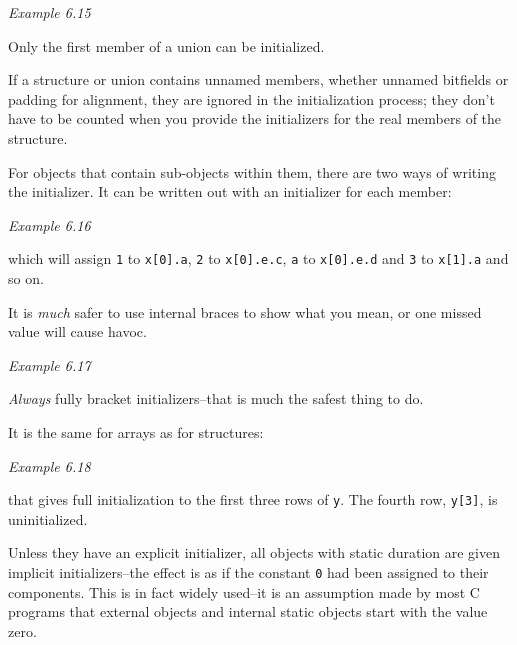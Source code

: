     \begin{center}\textit{Example 6.15}\end{center}


   Only the first member of a union can be initialized.


   If a structure or union contains unnamed members, whether unnamed
    bitfields or padding for alignment, they are ignored in the initialization
    process; they don't have to be counted when you provide the initializers
    for the real members of the structure.


   For objects that contain sub-objects within them, there are two ways of
    writing the initializer. It can be written out with an initializer for each
    member:


    \begin{center}\textit{Example 6.16}\end{center}


   which will assign \texttt{1} to \texttt{x[0].a}, \texttt{2}
    to \texttt{x[0].e.c}, \texttt{a} to \texttt{x[0].e.d} and
    \texttt{3} to \texttt{x[1].a} and so on.


   It is \textit{much} safer to use internal braces to show what you mean,
    or one missed value will cause havoc.


    \begin{center}\textit{Example 6.17}\end{center}


   \textit{Always} fully bracket initializers--that is much the safest
    thing to do.


   It is the same for arrays as for structures:


   \begin{center}\textit{Example 6.18}\end{center}


   that gives full initialization to the first three rows of \texttt{y}.
    The fourth row, \texttt{y[3]}, is uninitialized.


   Unless they have an explicit initializer, all objects with static
    duration are given implicit initializers--the effect is as if the
    constant \texttt{0} had been assigned to their components. This is in
    fact widely used--it is an assumption made by most C programs that
    external objects and internal static objects start with the value zero.


